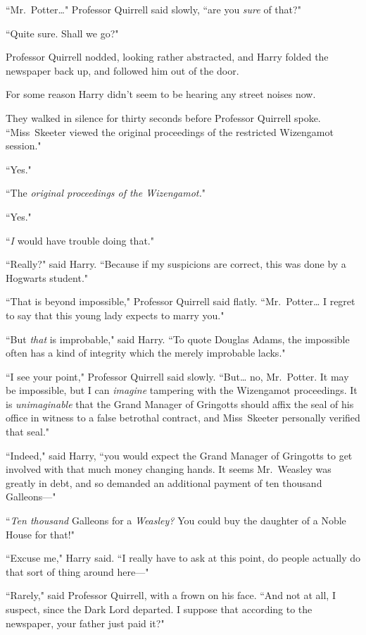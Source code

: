 ``Mr.~Potter{\ldots}" Professor Quirrell said slowly, ``are you \emph{sure} of that?"

``Quite sure. Shall we go?"

Professor Quirrell nodded, looking rather abstracted, and Harry folded the newspaper back up, and followed him out of the door.

For some reason Harry didn't seem to be hearing any street noises now.

They walked in silence for thirty seconds before Professor Quirrell spoke. ``Miss~Skeeter viewed the original proceedings of the restricted Wizengamot session."

``Yes."

``The \emph{original proceedings of the Wizengamot.}"

``Yes."

``\emph{I} would have trouble doing that."

``Really?" said Harry. ``Because if my suspicions are correct, this was done by a Hogwarts student."

``That is beyond impossible," Professor Quirrell said flatly. ``Mr.~Potter{\ldots} I regret to say that this young lady expects to marry you."

``But \emph{that} is improbable," said Harry. ``To quote Douglas Adams, the impossible often has a kind of integrity which the merely improbable lacks."

``I see your point," Professor Quirrell said slowly. ``But{\ldots} no, Mr.~Potter. It may be impossible, but I can \emph{imagine} tampering with the Wizengamot proceedings. It is \emph{unimaginable} that the Grand Manager of Gringotts should affix the seal of his office in witness to a false betrothal contract, and Miss~Skeeter personally verified that seal."

``Indeed," said Harry, ``you would expect the Grand Manager of Gringotts to get involved with that much money changing hands. It seems Mr.~Weasley was greatly in debt, and so demanded an additional payment of ten thousand Galleons---"

``\emph{Ten thousand} Galleons for a \emph{Weasley?} You could buy the daughter of a Noble House for that!"

``Excuse me," Harry said. ``I really have to ask at this point, do people actually do that sort of thing around here---"

``Rarely," said Professor Quirrell, with a frown on his face. ``And not at all, I suspect, since the Dark Lord departed. I suppose that according to the newspaper, your father just paid it?"

